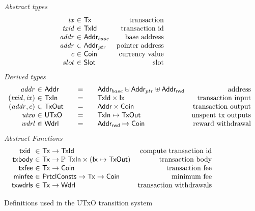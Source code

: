 \documentclass[11pt,a4paper,dvipsnames]{article}
\newcommand{\Tx}{\type{Tx}}
\newcommand{\Ix}{\type{Ix}}
\newcommand{\TxId}{\type{TxId}}
\newcommand{\Addr}{\type{Addr}}
\newcommand{\UTxO}{\type{UTxO}}
\newcommand{\Wdrl}{\type{Wdrl}}
\newcommand{\Coin}{\type{Coin}}
\newcommand{\PrtclConsts}{\type{PrtclConsts}}
\newcommand{\Slot}{\type{Slot}}
\newcommand{\AddrRWD}{\type{Addr_{rwd}}}
\newcommand{\TxIn}{\type{TxIn}}
\newcommand{\TxOut}{\type{TxOut}}
\newcommand{\txid}[1]{\fun{txid}~ \var{#1}}
\theoremstyle{definition}
\theoremstyle{definition}
\begin{document}
\begin{figure*}
  \emph{Abstract types}
  \begin{equation*}
    \begin{array}{r@{~\in~}lr}
      \var{tx} & \Tx & \text{transaction}\\
      \var{txid} & \TxId & \text{transaction id}\\
      \var{addr} & \Addr_{base} & \text{base address}\\
      \var{addr} & \Addr_{ptr} & \text{pointer address}\\
      c & \Coin & \text{currency value}\\
      slot & \Slot & \text{slot}
    \end{array}
  \end{equation*}
  \emph{Derived types}
  \begin{equation*}
    \begin{array}{r@{~\in~}l@{\qquad=\qquad}lr}
      \var{addr}
      & \Addr
      & \Addr_{base} \uniondistinct \Addr_{ptr} \uniondistinct \AddrRWD
      & \text{address}\\
      (\var{txid}, \var{ix})
      & \TxIn
      & \TxId \times \Ix
      & \text{transaction input}
      \\
      (\var{addr}, c)
      & \type{TxOut}
      & \Addr \times \Coin
      & \text{transaction output}
      \\
      \var{utxo}
      & \UTxO
      & \TxIn \mapsto \TxOut
      & \text{unspent tx outputs}
      \\
      \var{wdrl}
      & \Wdrl
      & \AddrRWD \mapsto \Coin
      & \text{reward withdrawal}
    \end{array}
  \end{equation*}
  \emph{Abstract Functions}
  \begin{equation*}
    \begin{array}{r@{~\in~}lr}
      \txid{} & \Tx \to \TxId & \text{compute transaction id}\\
      \fun{txbody} & \Tx \to \powerset{\TxIn} \times (\Ix \mapsto \TxOut)
                                  & \text{transaction body}\\
      \fun{txfee} & \Tx \to \Coin & \text{transaction fee}\\
      \fun{minfee} & \PrtclConsts \to \Tx \to \Coin & \text{minimum fee}\\
      \fun{txwdrls} & \Tx \to \Wdrl & \text{transaction withdrawals}\\
    \end{array}
  \end{equation*}
  \caption{Definitions used in the UTxO transition system}
  \label{fig:defs:utxo}
\end{figure*}
\end{document}
